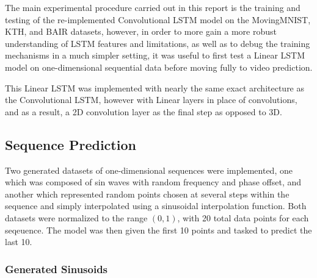 \documentclass{scrartcl}
\begin{document}

The main experimental procedure carried out in this report is the training and
testing of the re-implemented Convolutional LSTM model on the MovingMNIST, KTH,
and BAIR datasets, however, in order to more gain a more robust understanding
of LSTM features and limitations, as well as to debug the training mechanisms
in a much simpler setting, it was useful to first test a Linear LSTM model on
one-dimensional sequential data before moving fully to video prediction.

This Linear LSTM was implemented with nearly the same exact architecture as the
Convolutional LSTM, however with Linear layers in place of convolutions, and as
a result, a 2D convolution layer as the final step as opposed to 3D.


\subsection{Sequence Prediction}
\label{subsec:experiment_sp}

Two generated datasets of one-dimensional sequences were implemented, one which
was composed of sin waves with random frequency and phase offset, and another
which represented random points chosen at several steps within the sequence and
simply interpolated using a sinusoidal interpolation function. Both datasets
were normalized to the range $(0, 1)$, with 20 total data points for each
seqeuence. The model was then given the first 10 points and tasked to predict
the last 10.

\subsubsection{Generated Sinusoids}
\label{subsubsec:generated_sins}
\end{document}
